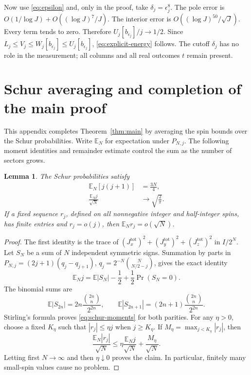 \documentclass[aps,pra,reprint,superscriptaddress,longbibliography]{revtex4-2}
\newtheorem{lemma}[theorem]{Lemma}
\theoremstyle{remark}
\newcommand{\E}{\mathbb E}
\begin{document}
Now use \eqref{eq:epsilon} and, only in the proof, take
$\delta_j=\epsilon_j^8$. The pole error is
$O(1/\log J)+O((\log J)^7/J)$. The interior error is
$O((\log J)^{50}/\sqrt J)$.
Every term tends to zero. Therefore
$U_j[b_{\epsilon_j}]/j\to1/2$.
Since $L_j\leq V_j\leq W_j[b_{\epsilon_j}]\leq
U_j[b_{\epsilon_j}]$, \eqref{eq:explicit-energy} follows.
The cutoff $\delta_j$ has no role in the measurement; all columns
and all real outcomes $t$ remain present.


\section{Schur averaging and completion of the main proof}\label{sec:averaging}
This appendix completes Theorem~\ref{thm:main} by averaging the spin
bounds over the Schur probabilities. Write $\E_N$ for expectation under
$P_{N,j}$. The following moment identities and remainder estimate control
the sum as the number of sectors grows.

\begin{lemma}\label{lem:averaging}
The Schur probabilities satisfy
\begin{equation}
\begin{aligned}
\E_N[j(j+1)]&=\frac{3N}{4},\\
\frac{\E_Nj}{\sqrt N}&\longrightarrow\sqrt{\frac2\pi}.
\end{aligned}
\label{eq:schur-moments}
\end{equation}
If a fixed sequence $r_j$, defined on all nonnegative integer and
half-integer spins, has finite entries and $r_j=o(j)$, then
$\E_Nr_j=o(\sqrt N)$.
\end{lemma}
\begin{proof}
The first identity is the trace of
$(J_x^{\mathrm{tot}})^2+(J_y^{\mathrm{tot}})^2+
(J_z^{\mathrm{tot}})^2$ in $I/2^N$.
Let $S_N$ be a sum of $N$ independent symmetric signs. Summation
by parts in
$P_{N,j}=(2j+1)(q_j-q_{j+1})$,
$q_j=2^{-N}\binom N{N/2-j}$, gives the exact identity
\begin{equation}
 \E_Nj=\E|S_N|-\frac12+\frac12\Pr(S_N=0).
 \label{eq:walk}
\end{equation}
The binomial sums are
\[
 \E|S_{2n}|=2n\frac{\binom{2n}n}{2^{2n}},\qquad
 \E|S_{2n+1}|=(2n+1)\frac{\binom{2n}n}{2^{2n}}.
\]
Stirling's formula proves \eqref{eq:schur-moments} for both parities.
For any $\eta>0$, choose a fixed $K_\eta$ such that
$|r_j|\leq\eta j$ when $j\geq K_\eta$. If
$M_\eta=\max_{j<K_\eta}|r_j|$, then
\[
 \frac{\E_N|r_j|}{\sqrt N}
 \leq\eta\frac{\E_Nj}{\sqrt N}+\frac{M_\eta}{\sqrt N}.
\]
Letting first $N\to\infty$ and then $\eta\downarrow0$ proves the
claim. In particular, finitely many small-spin values cause no
problem.
\end{proof}
\end{document}

